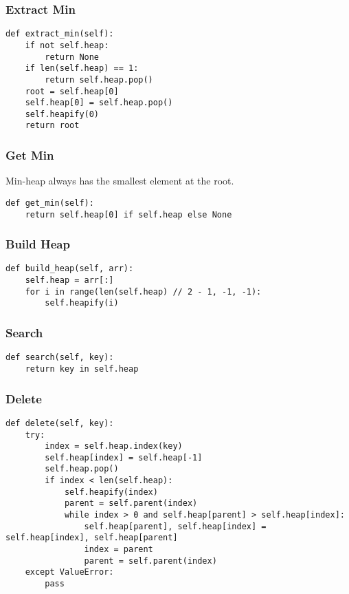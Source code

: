 \subsubsection{Extract Min}
\begin{algo}
\begin{lstlisting}
def extract_min(self):
    if not self.heap:
        return None
    if len(self.heap) == 1:
        return self.heap.pop()
    root = self.heap[0]
    self.heap[0] = self.heap.pop()
    self.heapify(0)
    return root
\end{lstlisting}
\end{algo}

\subsubsection{Get Min}
\begin{algo} Min-heap always has the smallest element at the root.
\begin{lstlisting}
def get_min(self):
    return self.heap[0] if self.heap else None
\end{lstlisting}
\end{algo}

\subsubsection{Build Heap}
\begin{algo}
\begin{lstlisting}
def build_heap(self, arr):
    self.heap = arr[:]
    for i in range(len(self.heap) // 2 - 1, -1, -1):
        self.heapify(i)
\end{lstlisting}
\end{algo}

\subsubsection{Search}
\begin{algo}
\begin{lstlisting}
def search(self, key):
    return key in self.heap
\end{lstlisting}
\end{algo}

\subsubsection{Delete}
\begin{algo}
\begin{lstlisting}
def delete(self, key):
    try:
        index = self.heap.index(key)
        self.heap[index] = self.heap[-1]
        self.heap.pop()
        if index < len(self.heap):
            self.heapify(index)
            parent = self.parent(index)
            while index > 0 and self.heap[parent] > self.heap[index]:
                self.heap[parent], self.heap[index] = self.heap[index], self.heap[parent]
                index = parent
                parent = self.parent(index)
    except ValueError:
        pass
\end{lstlisting}
\end{algo}

